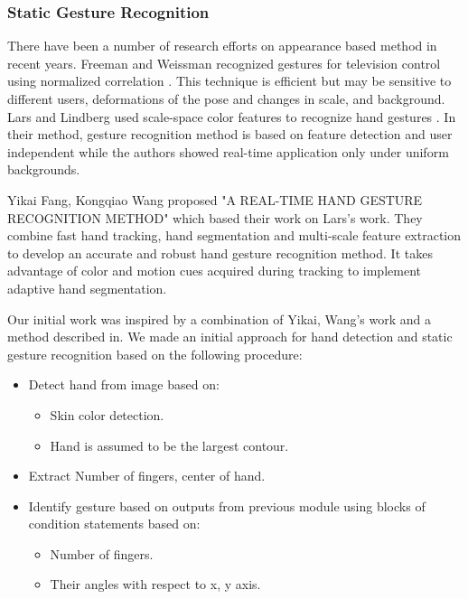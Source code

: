 \subsubsection{Static Gesture Recognition}

There have been a number of research efforts on appearance based method in recent years. Freeman and Weissman recognized gestures for television control using normalized correlation \cite{relatedsg3}. This technique is efficient but may be sensitive to different users, deformations of the pose and changes in scale, and background. Lars and Lindberg used scale-space color features to recognize hand gestures \cite{relatedsg4}. In their method, gesture recognition method is based on feature detection and user independent while the authors showed real-time application only under uniform backgrounds.
\bigskip

Yikai Fang, Kongqiao Wang proposed "A REAL-TIME HAND GESTURE RECOGNITION METHOD" \cite{relatedsg5} which based their work on Lars's work. They combine fast hand tracking, hand segmentation and multi-scale feature extraction to develop an accurate and robust hand gesture recognition method. It takes advantage of color and motion cues acquired during tracking to implement adaptive hand segmentation.
\bigskip

Our initial work was inspired by a combination of Yikai, Wang's work and a method described in\cite{survey}. We made an initial approach for hand detection and static gesture recognition based on the following procedure:\bigskip


\begin{itemize}
\item Detect hand from image based on:
\begin{itemize}
\item Skin color detection.
\item Hand is assumed to be the largest contour.
\end{itemize}
\item Extract Number of fingers, center of hand.
\item Identify gesture based on outputs from previous module using blocks of condition statements based on:
\begin{itemize}
\item Number of fingers.
\item Their angles with respect to x, y axis.
\end{itemize}
\end{itemize}
\bigskip


